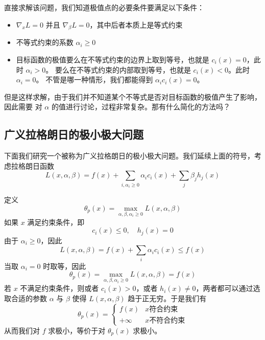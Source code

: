 直接求解该问题，我们知道极值点的必要条件要满足以下条件：

\begin{itemize}
\item $\nabla_x L=0$ 并且 $\nabla_\beta L=0$，其中后者本质上是等式约束
\item 不等式约束的系数 $\alpha_i \geqslant0$
\item 目标函数的极值要么在不等式约束的边界上取到等号，也就是 $c_i(x)=0$，此时 $\alpha_i>0$。
要么在不等式约束的内部取到等号，也就是 $c_i(x)<0$。此时 $\alpha_i=0$。
不管是哪一种情形，我们都能得到 $\alpha_i c_i(x)=0$。
\end{itemize}

但是这样求解，由于我们并不知道某个不等式是否对目标函数的极值产生了影响，因此需要
对 $\alpha$ 的值进行讨论，过程非常复杂。那有什么简化的方法吗？

\subsection{广义拉格朗日的极小极大问题}

下面我们研究一个被称为广义拉格朗日的极小极大问题。我们延续上面的符号，考虑拉格朗日函数
\begin{equation}
L(x,\alpha, \beta) = f(x) +
 \sum_{i,\alpha_i \geqslant 0} \alpha_i c_i(x) +
 \sum_{j} \beta_{j} h_j(x) 
\end{equation}

定义
\begin{equation}
\theta_p(x) = \max_{\alpha,\beta,\alpha_i\geqslant0}
L(x, \alpha, \beta)
\end{equation}
如果 $x$ 满足约束条件，即
\begin{equation}
c_i(x)\le0,\quad h_j(x)=0
\end{equation}
由于 $\alpha_i\ge0$，因此
\begin{equation}
L(x,\alpha,\beta)
=
f(x)+\sum_i\alpha_i c_i(x)
\le f(x)
\end{equation}
当取 $\alpha_i=0$ 时取等，因此
\begin{equation}
\theta_p(x)
=
\max_{\alpha,\beta,\alpha_i\geqslant0}L(x,\alpha,\beta)
=
f(x)
\end{equation}
若 $x$ 不满足约束条件，则或者 $c_i(x) >0$，或者 $h_i(x) \neq 0$，两者都可以通过选取合适的参数
$\alpha$ 与 $\beta$ 使得 $L(x, \alpha, \beta)$ 趋于正无穷。于是我们有
\begin{equation}
\theta_p(x) =\begin{cases}
f(x)   & x \text{符合约束} \\
+\infty & x \text{不符合约束}
\end{cases}
\end{equation}
从而我们对 $f$ 求极小，等价于对 $\theta_p(x)$ 求极小。

